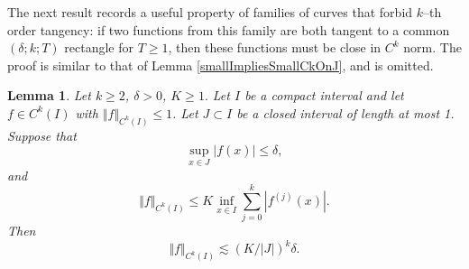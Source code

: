 \documentclass[letterpaper, reqno,11pt]{article}
\numberwithin{equation}{section}
\numberwithin{thm}{section}
\newtheorem{lem}[thm]{Lemma}
\theoremstyle{remark}
\begin{document}
The next result records a useful property of families of curves that forbid $k$--th order tangency: if two functions from this family are both tangent to a common $(\delta; k; T)$ rectangle for $T\geq 1$, then these functions must be close in $C^k$ norm. The proof is similar to that of Lemma \ref{smallImpliesSmallCkOnJ}, and is omitted. 
\begin{lem}\label{smallImpliesSmallCkOnJCinematic}
Let $k\geq 2$, $\delta>0$, $K\geq 1.$ Let $I$ be a compact interval and let $f\in C^k(I)$ with $\Vert f \Vert_{C^k(I)}\leq 1$. Let $J\subset I$ be a closed interval of length at most 1. Suppose that 
\begin{equation}\label{fxLessDelta}
\sup_{x\in J}|f(x)|\leq\delta,
\end{equation}
and 
\begin{equation}\label{CkNormControlledInf}
\Vert f \Vert_{C^k(I)}\leq K\inf_{x\in I}\sum_{j=0}^k|f^{(j)}(x)|.
\end{equation}
Then 
\begin{equation}\label{smallImpliesSmallCkOnJConclusion2}
\Vert f \Vert_{C^k(I)}\lesssim (K/|J|)^k \delta.
\end{equation}
\end{lem}





\end{document}
